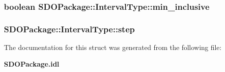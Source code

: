 \subsubsection{\setlength{\rightskip}{0pt plus 5cm}boolean {\bf SDOPackage::Interval\-Type::min\_\-inclusive}}\label{structSDOPackage_1_1IntervalType_SDOPackage_1_1IntervalTypeo2}


\subsubsection{ {\bf SDOPackage::Interval\-Type::step}}\label{structSDOPackage_1_1IntervalType_SDOPackage_1_1IntervalTypeo4}




The documentation for this struct was generated from the following file:\begin{CompactItemize}
\item 
{\bf SDOPackage.idl}\end{CompactItemize}
